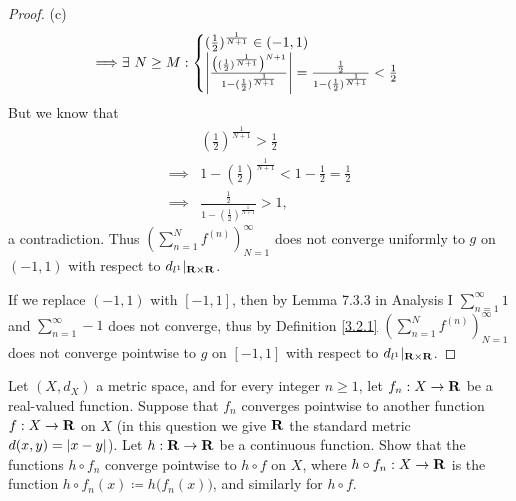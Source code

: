 \begin{proof}{(c)}
\begin{align*}
        \implies & \exists\ N \geq M : \begin{cases}
                                           (\frac{1}{2})^{\frac{1}{N + 1}} \in (-1, 1) \\
                                           \left\lvert\frac{\big((\frac{1}{2})^{\frac{1}{N + 1}}\big)^{N + 1}}{1 - (\frac{1}{2})^{\frac{1}{N + 1}}}\right\rvert = \frac{\frac{1}{2}}{1 - (\frac{1}{2})^{\frac{1}{N + 1}}} < \frac{1}{2}
                                       \end{cases}
    \end{align*}
    But we know that
    \begin{align*}
                 & (\frac{1}{2})^{\frac{1}{N + 1}} > \frac{1}{2}                       \\
        \implies & 1 - (\frac{1}{2})^{\frac{1}{N + 1}} < 1 - \frac{1}{2} = \frac{1}{2} \\
        \implies & \frac{\frac{1}{2}}{1 - (\frac{1}{2})^{\frac{1}{N + 1}}} > 1,
    \end{align*}
    a contradiction.
    Thus \((\sum_{n = 1}^N f^{(n)})_{N = 1}^\infty\) does not converge uniformly to \(g\) on \((-1, 1)\) with respect to \(d_{l^1}|_{\mathbf{R} \times \mathbf{R}}\).

    If we replace \((-1, 1)\) with \([-1, 1]\), then by Lemma 7.3.3 in Analysis I \(\sum_{n = 1}^\infty 1\) and \(\sum_{n = 1}^\infty -1\) does not converge, thus by Definition \ref{3.2.1} \((\sum_{n = 1}^N f^{(n)})_{N = 1}^\infty\) does not converge pointwise to \(g\) on \([-1, 1]\) with respect to \(d_{l^1}|_{\mathbf{R} \times \mathbf{R}}\).
\end{proof}

\begin{exercise}\label{ex 3.2.3}
    Let \((X, d_X)\) a metric space, and for every integer \(n \geq 1\), let \(f_n : X \to \mathbf{R}\) be a real-valued function.
    Suppose that \(f_n\) converges pointwise to another function \(f : X \to \mathbf{R}\) on \(X\)
    (in this question we give \(\mathbf{R}\) the standard metric \(d(x, y) = \left\lvert x - y\right\rvert\)).
    Let \(h : \mathbf{R} \to \mathbf{R}\) be a continuous function.
    Show that the functions \(h \circ f_n\) converge pointwise to \(h \circ f\) on \(X\), where \(h \circ f_n : X \to \mathbf{R}\) is the function \(h \circ f_n(x) \coloneqq h\big(f_n(x)\big)\), and similarly for \(h \circ f\).
\end{exercise}

